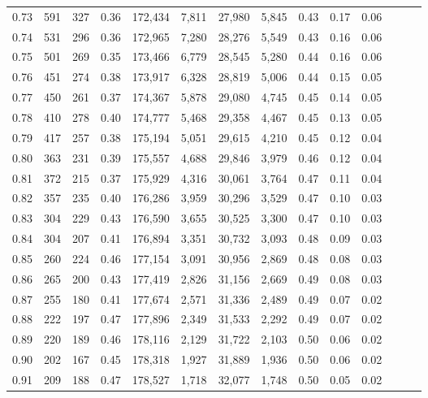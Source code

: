 \begin{tabular}{rrrrrrrrrrrrrr}
0.73 &    591 &  327 &  0.36 &  172,434 &    7,811 &  27,980 &   5,845 &  0.43 &  0.17 &      0.06 \\
0.74 &    531 &  296 &  0.36 &  172,965 &    7,280 &  28,276 &   5,549 &  0.43 &  0.16 &      0.06 \\
0.75 &    501 &  269 &  0.35 &  173,466 &    6,779 &  28,545 &   5,280 &  0.44 &  0.16 &      0.06 \\
0.76 &    451 &  274 &  0.38 &  173,917 &    6,328 &  28,819 &   5,006 &  0.44 &  0.15 &      0.05 \\
0.77 &    450 &  261 &  0.37 &  174,367 &    5,878 &  29,080 &   4,745 &  0.45 &  0.14 &      0.05 \\
0.78 &    410 &  278 &  0.40 &  174,777 &    5,468 &  29,358 &   4,467 &  0.45 &  0.13 &      0.05 \\
0.79 &    417 &  257 &  0.38 &  175,194 &    5,051 &  29,615 &   4,210 &  0.45 &  0.12 &      0.04 \\
0.80 &    363 &  231 &  0.39 &  175,557 &    4,688 &  29,846 &   3,979 &  0.46 &  0.12 &      0.04 \\
0.81 &    372 &  215 &  0.37 &  175,929 &    4,316 &  30,061 &   3,764 &  0.47 &  0.11 &      0.04 \\
0.82 &    357 &  235 &  0.40 &  176,286 &    3,959 &  30,296 &   3,529 &  0.47 &  0.10 &      0.03 \\
0.83 &    304 &  229 &  0.43 &  176,590 &    3,655 &  30,525 &   3,300 &  0.47 &  0.10 &      0.03 \\
0.84 &    304 &  207 &  0.41 &  176,894 &    3,351 &  30,732 &   3,093 &  0.48 &  0.09 &      0.03 \\
0.85 &    260 &  224 &  0.46 &  177,154 &    3,091 &  30,956 &   2,869 &  0.48 &  0.08 &      0.03 \\
0.86 &    265 &  200 &  0.43 &  177,419 &    2,826 &  31,156 &   2,669 &  0.49 &  0.08 &      0.03 \\
0.87 &    255 &  180 &  0.41 &  177,674 &    2,571 &  31,336 &   2,489 &  0.49 &  0.07 &      0.02 \\
0.88 &    222 &  197 &  0.47 &  177,896 &    2,349 &  31,533 &   2,292 &  0.49 &  0.07 &      0.02 \\
0.89 &    220 &  189 &  0.46 &  178,116 &    2,129 &  31,722 &   2,103 &  0.50 &  0.06 &      0.02 \\
0.90 &    202 &  167 &  0.45 &  178,318 &    1,927 &  31,889 &   1,936 &  0.50 &  0.06 &      0.02 \\
0.91 &    209 &  188 &  0.47 &  178,527 &    1,718 &  32,077 &   1,748 &  0.50 &  0.05 &      0.02 \\

\end{tabular}

